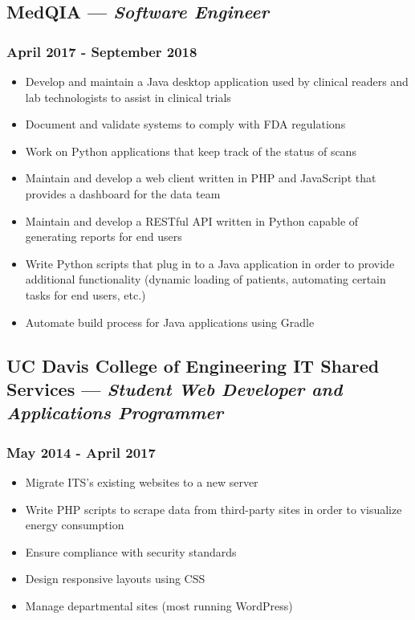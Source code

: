 \documentclass{article}
\begin{document}
\begin{minipage}[t]{.8\textwidth}
\subsection*{MedQIA --- \textit{Software Engineer}}
\subsubsection*{April 2017 - September 2018}
\parbox[t]{.5\textwidth}{\raggedright%
\begin{itemize}
\vspace{-1.5em}
	\item Develop and maintain a Java desktop application used by clinical readers and lab technologists to assist in clinical trials
	\item Document and validate systems to comply with FDA regulations
	\item Work on Python applications that keep track of the status of scans
	\item Maintain and develop a web client written in PHP and JavaScript that provides a dashboard for the data team
\end{itemize}}
\parbox[t]{.5\textwidth}{\raggedright%
\vspace{-1.5em}
\begin{itemize}
	\item Maintain and develop a RESTful API written in Python capable of generating reports for end users
	\item Write Python scripts that plug in to a Java application in order to provide additional functionality (dynamic loading of patients, automating certain tasks for end users, etc.)
	\item Automate build process for Java applications using Gradle
\end{itemize}}
\vspace{-1.5em}
\subsection*{UC Davis College of Engineering IT Shared Services --- \textit{Student Web Developer and Applications Programmer}}
\subsubsection*{May 2014 - April 2017}
\parbox[t]{.5\textwidth}{\raggedright%
\begin{itemize}
\vspace{-1.5em}
	\item Migrate ITS's existing websites to a new server
	\item Write PHP scripts to scrape data from third-party sites in order to visualize energy consumption
\end{itemize}}
\parbox[t]{.5\textwidth}{\raggedright%
\vspace{-1.5em}
\begin{itemize}
	\item Ensure compliance with security standards
	\item Design responsive layouts using CSS
	\item Manage departmental sites (most running WordPress)
\end{itemize}}

\end{minipage}
\end{document}
